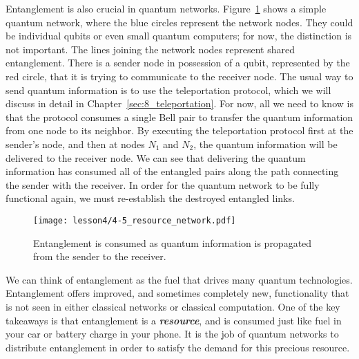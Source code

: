 Entanglement is also crucial in quantum networks.
Figure~\ref{fig:4-5_resource_network} shows a simple quantum network, where the blue circles represent the network nodes.
They could be individual qubits or even small quantum computers; for now, the distinction is not important.
The lines joining the network nodes represent shared entanglement.
There is a sender node in possession of a qubit, represented by the red circle, that it is trying to communicate to the receiver node.
The usual way to send quantum information is to use the teleportation protocol, which we will discuss in detail in Chapter~\ref{sec:8_teleportation}.
For now, all we need to know is that the protocol consumes a single Bell pair to transfer the quantum information from one node to its neighbor.
By executing the teleportation protocol first at the sender's node, and then at nodes $N_1$ and $N_2$, the quantum information will be delivered to the receiver node.
We can see that delivering the quantum information has consumed all of the entangled pairs along the path connecting the sender with the receiver.
In order for the quantum network to be fully functional again, we must re-establish the destroyed entangled links.

\begin{figure}[t]
    \centering
    \texttt{[image: lesson4/4-5\_resource\_network.pdf]}
    \caption[Consumption of entanglement in a quantum network.]{Entanglement is consumed as quantum information is propagated from the sender to the receiver.}
    \label{fig:4-5_resource_network}
\end{figure}

We can think of entanglement as the fuel that drives many quantum technologies. Entanglement offers improved, and sometimes completely new, functionality that is not seen in either classical networks or classical computation.
One of the key takeaways is that entanglement is a \textbf{\textit{resource}}, and is consumed just like fuel in your car or battery charge in your phone.
It is the job of quantum networks to distribute entanglement in order to satisfy the demand for this precious resource.


